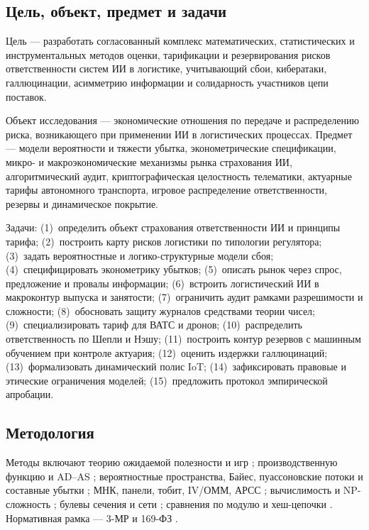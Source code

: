 \documentclass[a4paper,14pt]{extarticle}
\begin{document}
\subsection*{Цель, объект, предмет и задачи}

Цель --- разработать согласованный комплекс математических, статистических и инструментальных методов оценки, тарификации и резервирования рисков ответственности систем ИИ в логистике, учитывающий сбои, кибератаки, галлюцинации, асимметрию информации и солидарность участников цепи поставок.

Объект исследования --- экономические отношения по передаче и распределению риска, возникающего при применении ИИ в логистических процессах. Предмет --- модели вероятности и тяжести убытка, эконометрические спецификации, микро- и макроэкономические механизмы рынка страхования ИИ, алгоритмический аудит, криптографическая целостность телематики, актуарные тарифы автономного транспорта, игровое распределение ответственности, резервы и динамическое покрытие.

Задачи: (1)~определить объект страхования ответственности ИИ и принципы тарифа; (2)~построить карту рисков логистики по типологии регулятора; (3)~задать вероятностные и логико-структурные модели сбоя; (4)~специфицировать эконометрику убытков; (5)~описать рынок через спрос, предложение и провалы информации; (6)~встроить логистический ИИ в макроконтур выпуска и занятости; (7)~ограничить аудит рамками разрешимости и сложности; (8)~обосновать защиту журналов средствами теории чисел; (9)~специализировать тариф для ВАТС и дронов; (10)~распределить ответственность по Шепли и Нэшу; (11)~построить контур резервов с машинным обучением при контроле актуария; (12)~оценить издержки галлюцинаций; (13)~формализовать динамический полис IoT; (14)~зафиксировать правовые и этические ограничения моделей; (15)~предложить протокол эмпирической апробации.

\subsection*{Методология}

Методы включают теорию ожидаемой полезности и игр \cite{pindyck}; производственную функцию и AD--AS \cite{blanchard}; вероятностные пространства, Байес, пуассоновские потоки и составные убытки \cite{shvedov}; МНК, панели, тобит, IV/ОММ, АРСС \cite{verbeek}; вычислимость и NP-сложность \cite{vereshchagin, cormen}; булевы сечения и сети \cite{yablonsky}; сравнения по модулю и хеш-цепочки \cite{borevich, cormen}. Нормативная рамка --- 3-МР и 169-ФЗ \cite{cbr, fz169}.
\end{document}
